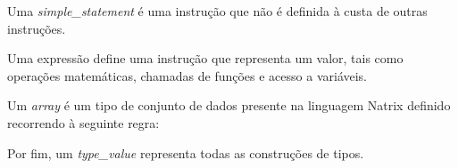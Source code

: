 Uma \textit{simple\_statement} é uma instrução que não é definida à custa de outras instruções.




\clearpage

Uma expressão define uma instrução que representa um valor, tais como operações matemáticas, chamadas de funções e acesso a variáveis.



Um \textit{array} é um tipo de conjunto de dados presente na linguagem Natrix definido recorrendo à seguinte regra:



Por fim, um \textit{type\_value} representa todas as construções de tipos.


